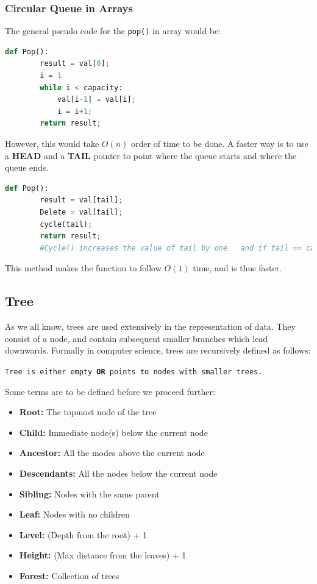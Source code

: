\documentclass{article}
\theoremstyle{definition}
\theoremstyle{example}
\begin{document}
\subsubsection{\Large Circular Queue in Arrays}
\hspace{4mm} The general pseudo code for the \texttt{pop()} in array would be:

\begin{lstlisting}[language = python, basicstyle= \Large]
    def Pop():
        result = val[0];
        i = 1
        while i < capacity:
            val[i-1] = val[i];
            i = i+1;
        return result;
\end{lstlisting}

However, this would take $O(n)$ order of time to be done. A faster way is to use a \textbf{HEAD} and a \textbf{TAIL} pointer to point where the queue starts and where the queue ends.\par

\begin{lstlisting}[basicstyle = \Large, language = python]
    def Pop():
        result = val[tail];
        Delete = val[tail];
        cycle(tail);
        return result;
        #Cycle() increases the value of tail by one   and if tail == capacity, it makes it's value 0 
\end{lstlisting}

This method makes the function to follow $O(1)$ time, and is thus faster.

\subsection{\Large Tree}
\hspace{4mm} As we all know, trees are used extensively in the representation of data. They consist of a node, and contain subsequent smaller branches which lead downwards. Formally in computer science, trees are recursively defined as follows:\par
\vspace{4mm}
\noindent \texttt{Tree is either empty \textbf{OR} points to nodes with smaller trees.}\par
\vspace{4mm}
\noindent Some terms are to be defined before we proceed further:
\begin{itemize}
    \item \textbf{Root:} The topmost node of the tree
    \item \textbf{Child: } Immediate node(s) below the current node
    \item \textbf{Ancestor: }All the modes above the current node
    \item \textbf{Descendants: }All the nodes below the current node
    \item \textbf{Sibling: }Nodes with the same parent
    \item \textbf{Leaf: }Nodes with no children
    \item \textbf{Level: }(Depth from the root) + 1
    \item \textbf{Height: }(Max distance from the leaves) + 1
    \item \textbf{Forest: }Collection of trees
\end{itemize}
\end{document}

